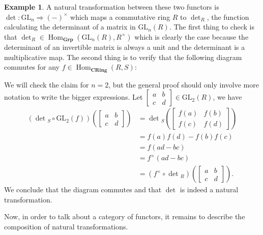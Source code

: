 \documentclass{article}
\theoremstyle{definition}
\newtheorem{exmp}[thm]{Example}
\theoremstyle{remark}
\DeclareMathOperator{\Hom}{Hom}
\newcommand{\gln}{\text{GL}_n}
\begin{document}
\begin{exmp}
	A natural transformation between these two functors is $\det:\gln \Rightarrow (-)^{\times}$ which maps a commutative ring $R$ to $\det_R$, the function calculating the determinant of a matrix in $\gln(R)$. The first thing to check is that $\det_R \in \Hom_{\textbf{Grp}}(\gln(R), R^{\times})$ which is clearly the case because the determinant of an invertible matrix is always a unit and the determinant is a multiplicative map. The second thing is to verify that the following diagram commutes for any $f\in \Hom_{\textbf{CRing}}(R,S)$:
	\begin{figure}[H]
		\centering
	\end{figure}
	We will check the claim for $n=2$, but the general proof should only involve more notation to write the bigger expressions. Let $\begin{bmatrix}a&b\\c&d\end{bmatrix} \in \text{GL}_2(R)$, we have 
	\begin{align*}
	(\det{}_S \circ \text{GL}_2(f))\left( \begin{bmatrix}a&b\\c&d\end{bmatrix} \right)&= 
	\det{}_S\left(\begin{bmatrix}f(a)&f(b)\\f(c)&f(d)\end{bmatrix}\right)\\
	&= f(a)f(d)-f(b)f(c)\\
	&= f(ad-bc)\\
	&= f^{\times}(ad-bc)\\
	&= (f^{\times}\circ \det{}_R)\left( \begin{bmatrix}a&b\\c&d\end{bmatrix}\right).
	\end{align*}
	We conclude that the diagram commutes and that $\det$ is indeed a natural transformation.
\end{exmp}
Now, in order to talk about a category of functors, it remains to describe the composition of natural transformations.
\end{document}
